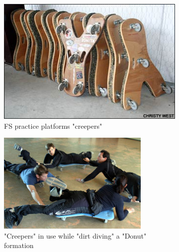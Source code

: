 \documentclass[a4paper, 11pt]{article}
\begin{document}
\begin{figure}[H]
	\centering
	\begin{subfigure}{.5\textwidth}
		\centering
		\includegraphics[width=0.9\linewidth]{creepers.jpg}
		\caption{FS practice platforms "creepers" \cite{creepers1}}
		\label{fig:creepers}
	\end{subfigure}%
	\begin{subfigure}{.5\textwidth}
		\centering
		\includegraphics[width=0.9\linewidth]{creepers_use.jpg}
		\caption{"Creepers" in use while "dirt diving" a "Donut" formation \cite{creepers2}}
		\label{fig:creepers_use}
	\end{subfigure}
	\caption{}
\end{figure}
%
\end{document}
